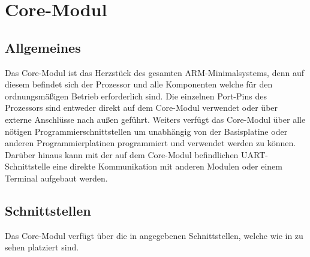 \section{Core-Modul}
\label{sec:coremodul}


\subsection{Allgemeines}
\label{sec:coremodul-allgemeines}

Das \gls{Core-Modul} ist das Herzstück des gesamten \gls{ARM}-\gls{Minimalsystem}s, denn auf diesem befindet sich der Prozessor und alle Komponenten welche für den ordnungsmäßigen Betrieb erforderlich sind. Die einzelnen Port-Pins des Prozessors sind entweder direkt auf dem \gls{Core-Modul} verwendet oder über externe Anschlüsse nach außen geführt. Weiters verfügt das \gls{Core-Modul} über alle nötigen Programmierschnittstellen um unabhängig von der \gls{Basisplatine} oder anderen Programmierplatinen programmiert und verwendet werden zu können. Darüber hinaus kann mit der auf dem \gls{Core-Modul} befindlichen UART-Schnittstelle eine direkte Kommunikation mit anderen Modulen oder einem Terminal aufgebaut werden.

\subsection{Schnittstellen}
\label{sec:coremodul-schnittstellen}

Das \gls{Core-Modul} verfügt über die in  angegebenen Schnittstellen, welche wie in  zu sehen platziert sind.


